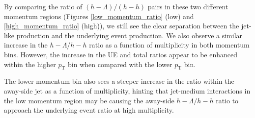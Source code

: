 \documentclass[ALICE,manyauthors]{ALICE_analysis_notes}
\begin{document}
By comparing the ratio of $(h-\Lambda)/(h-h)$ pairs in these two different momentum regions (Figures \ref{low_momentum_ratio} (low) and \ref{high_momentum_ratio} (high)), we still see the clear separation between the jet-like production and the underlying event production. We also observe a similar increase in the $h-\Lambda$/$h-h$ ratio as a function of multiplicity in both momentum bins. However, the increase in the UE and total ratios appear to be enhanced within the higher $p_{\text{T}}$ bin when compared with the lower $p_{\text{T}}$ bin.

 The lower momentum bin also sees a steeper increase in the ratio within the away-side jet as a function of multiplicity, hinting that jet-medium interactions in the low momentum region may be causing the away-side $h-\Lambda/h-h$ ratio to approach the underlying event ratio at high multiplicity.
\end{document}
